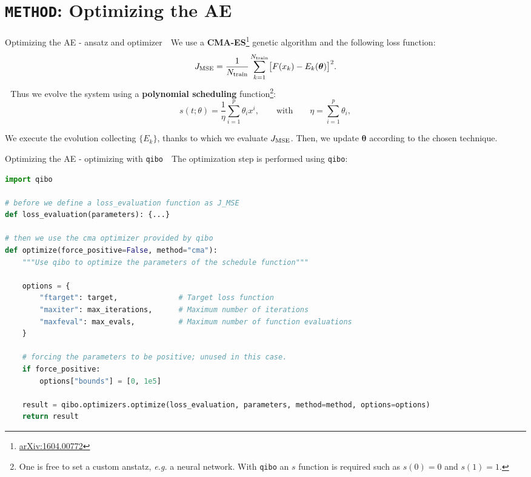 \documentclass[8pt, xcolor={svgnames}, hyperref={colorlinks, linkcolor=black, citecolor=amethyst, urlcolor=amethyst}]{beamer}
\begin{document}
\section{\texttt{METHOD}: Optimizing the AE}

\begin{frame}[fragile]{Optimizing the AE - ansatz and optimizer}
\large
\faArrowCircleRight\,\, We use a \textbf{CMA-ES}\footnote<1->{\href{https://arxiv.org/abs/1604.00772}{arXiv:1604.00772}} 
genetic algorithm and the following loss function:
\begin{equation}
    J_{\rm MSE} = \frac{1}{N_{\rm train}} \sum_{k = 1}^{N_{\rm train}} 
    \bigl[ F(x_k) - E_k(\bm{\theta}) \bigr]^2.
    \label{eq:loss_function}
\end{equation}
\pause
\faArrowCircleRight\,\, Thus we evolve the system using a \textbf{polynomial scheduling} 
function\footnote<2->{One is free to set a custom anstatz, \textit{e.g.} a neural 
network. With \texttt{qibo} an $s$ function is required such as $s(0)=0$ and $s(1)=1$.}:
\begin{equation}
s(t;\theta) = \frac{1}{\eta} \sum_{i=1}^{p} \theta_i x^{i}, \qquad
\text{with} \qquad \eta = \sum_{i=1}^{p} \theta_i,
\label{eq:scheduling_ansatz}
\end{equation}
\pause  
\vspace{0.1cm}
\begin{tcolorbox}[colback=amethyst!15, title=In each optimization step]
    We execute the evolution collecting $\{E_k\}    $, thanks to which we evaluate
    $J_{\rm MSE}$. Then, we update $\bm{\theta}$ according to the chosen technique.
\end{tcolorbox}
\end{frame}

\begin{frame}[fragile]{Optimizing the AE - optimizing with \texttt{qibo}}
\large
\faArrowCircleRight\,\, The optimization step is performed using \texttt{qibo}:
\begin{tcolorbox}
\begin{lstlisting}[language=Python]
import qibo 

# before we define a loss_evaluation function as J_MSE
def loss_evaluation(parameters): {...}

# then we use the cma optimizer provided by qibo
def optimize(force_positive=False, method="cma"):
    """Use qibo to optimize the parameters of the schedule function"""

    options = {
        "ftarget": target,              # Target loss function
        "maxiter": max_iterations,      # Maximum number of iterations
        "maxfeval": max_evals,          # Maximum number of function evaluations
    }
    
    # forcing the parameters to be positive; unused in this case.
    if force_positive:
        options["bounds"] = [0, 1e5]
        
    result = qibo.optimizers.optimize(loss_evaluation, parameters, method=method, options=options)
    return result
\end{lstlisting}
\end{tcolorbox}
\end{frame}
\end{document}
